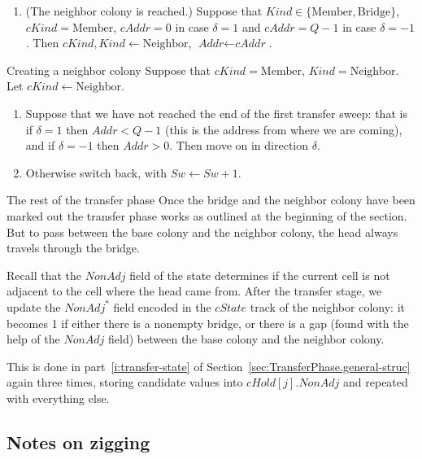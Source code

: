 \documentclass[12pt]{memoir}
\newcommand{\fld}[1]{\ensuremath{\textit{#1}}}
\newcommand{\Addr}{\fld{Addr}}
\newcommand{\cAddr}{\fld{cAddr}}
\newcommand{\NonAdj}{\fld{NonAdj}}
\newcommand{\cHold}{\fld{cHold}}
\newcommand{\Kind}{\fld{Kind}}
\newcommand{\cKind}{\fld{cKind}}
\newcommand{\cState}{\fld{cState}}
\newcommand{\Sweep}{\fld{Sw}}
\newcommand{\Bridge}{\mathrm{Bridge}}
\newcommand{\Member}{\mathrm{Member}}
\newcommand{\Neighbor}{\mathrm{Neighbor}}
\begin{document}
\begin{flushdescription}
\begin{enumerate}[1.]
\item (The neighbor colony is reached.) 
  Suppose that \( \Kind \in \{\Member,\Bridge \} \), \( \cKind = \Member \), 
  \( \cAddr = 0 \) in case \( \delta=1 \) and \( \cAddr =  Q-1 \) in case \( \delta=-1 \).
  Then \( \cKind, \Kind \gets \Neighbor \), \( \Addr \gets \cAddr \).

  \end{enumerate}

  \item[Creating a neighbor colony]
    Suppose that \( \cKind = \Member \), \( \Kind  =\Neighbor \).
Let \( \cKind \gets \Neighbor \).

    \begin{enumerate}[1.]
    \item Suppose that we have not reached the end of the first transfer sweep: that is 
if \( \delta=1 \) then \( \Addr<Q-1 \) (this is the address from where we are coming), 
and if \( \delta=-1 \) then \( \Addr>0 \).
Then move on in direction \( \delta \).
    \item Otherwise switch back, with \( \Sweep\gets\Sweep+1 \).
    \end{enumerate}

  \item[The rest of the transfer phase]
Once the bridge and the neighbor colony have been marked out the transfer phase
works as outlined at the beginning of the section.
But to pass between the base colony and the neighbor colony, the head always travels
through the bridge.

    \end{flushdescription}

Recall that the \( \NonAdj \) field of the state determines
if the current cell is not adjacent to the cell  where the head came from.
After the transfer stage, we update the \( \NonAdj^{*} \) field encoded in the
\( \cState \) track of the neighbor colony: it becomes 1 if either there is a nonempty bridge,
or there is a gap (found with the help of the \( \NonAdj \) field) between the base colony
and the neighbor colony.

This is done in part~\ref{i:transfer-state} 
of Section~\ref{sec:TransferPhase.general-struc}
again three times, storing candidate values into \( \cHold[j].\NonAdj \)
and repeated with everything else.

 \subsection{Notes on zigging}\label{sec:zigging}
\end{document}
